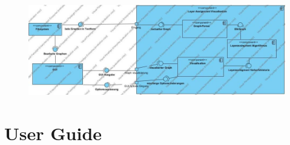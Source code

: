 \documentclass[12pt]{book}
\begin{document}
    
    \begin{figure}[ht!]
        \centering
        \includegraphics[width=\textwidth]{images/Component_Diagram1.jpg}
    \end{figure}
    
    
    
    
    
    
    
      
    
    
    
    
    
    
    \section*{User Guide}
    
    
    
    
    

    
    
    
    
    
    
\end{document}
